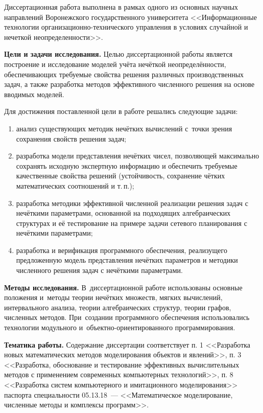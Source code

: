 Диссертационная работа выполнена в рамках одного из основных научных направлений Воронежского государственного университета <<Информационные технологии организационно-технического управления в условиях случайной и нечеткой неопределенности>>.

\textbf{Цели и задачи исследования.} Целью диссертационной работы является построение и исследование моделей учёта нечёткой неопределённости, обеспечивающих требуемые свойства решения различных производственных задач, а также разработка методов эффективного численного решения на основе вводимых моделей.

Для достижения поставленной цели в работе решались следующие задачи:
\begin{enumerate}
  \item анализ существующих методик нечётких вычислений с~точки зрения сохранения свойств решения задач;
  \item разработка модели представления нечётких чисел, позволяющей максимально сохранять исходную экспертную информацию и обеспечить требуемые качественные свойства решений (устойчивость, сохранение чётких математических соотношений и т.\,п.);
  \item разработка методики эффективной численной реализации решения задач с нечёткими параметрами, основанной на подходящих алгебраических структурах и её тестирование на примере задачи сетевого планирования с нечёткими параметрами;
  \item разработка и верификация программного обеспечения, реализущего предложенную модель представления нечётких параметров и методики численного решения задач с нечёткими параметрами.
\end{enumerate}

\textbf{Методы исследования.} В~диссертационной работе использованы основные положения и~методы теории нечётких множеств, мягких вычислений, интервального анализа, теории алгебраических структур, теории графов, численных методов. При~создании программного обеспечения использовались технологии модульного и~объектно-ориентированного программирования.

\textbf{Тематика работы.} Содержание диссертации соответствует п. 1 <<Разработка новых математических методов моделирования объектов и явлений>>, п. 3 <<Разработка, обоснование и тестирование эффективных вычислительных методов с применением современных компьютерных технологий>>, п. 8 <<Разработка систем компьютерного и имитационного моделирования>> паспорта специальности 05.13.18~--- <<Математическое моделирование, численные методы и комплексы программ>>.

